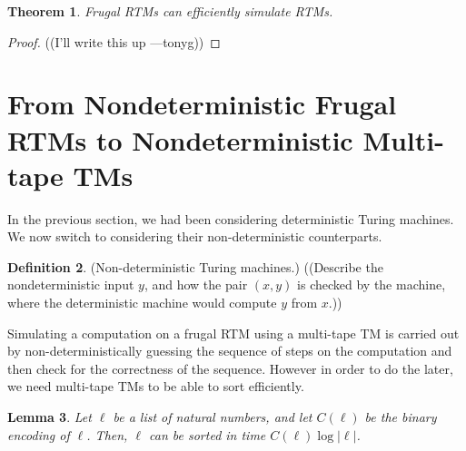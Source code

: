 \documentclass[english]{article}
\theoremstyle{plain}
\newtheorem{thm}{Theorem}
\theoremstyle{definition}
\newtheorem{defn}[thm]{Definition}
\theoremstyle{plain}
\newtheorem{lem}[thm]{Lemma}
\begin{document}
\begin{thm}
  Frugal RTMs can efficiently simulate RTMs.
\end{thm}

\begin{proof}
  ((I'll write this up ---tonyg))
\end{proof}

\section{From Nondeterministic Frugal RTMs to Nondeterministic Multi-tape TMs}

In the previous section, we had been considering deterministic Turing
machines. We now switch to considering their non-deterministic
counterparts.

\begin{defn}
  (Non-deterministic Turing machines.) ((Describe the nondeterministic
  input $y$, and how the pair $(x,y)$ is checked by the machine, where
  the deterministic machine would compute $y$ from $x$.))
\end{defn}

Simulating a computation on a frugal RTM using a multi-tape TM is
carried out by non-deterministically guessing the sequence of steps on
the computation and then check for the correctness of the
sequence. However in order to do the later, we need multi-tape TMs to
be able to sort efficiently.

\begin{lem}
  Let $\ell$ be a list of natural numbers, and let $C(\ell)$ be the
  binary encoding of $\ell$. Then, $\ell$ can be sorted in time
  $C(\ell)\log|\ell|$.
\end{lem}
\end{document}
